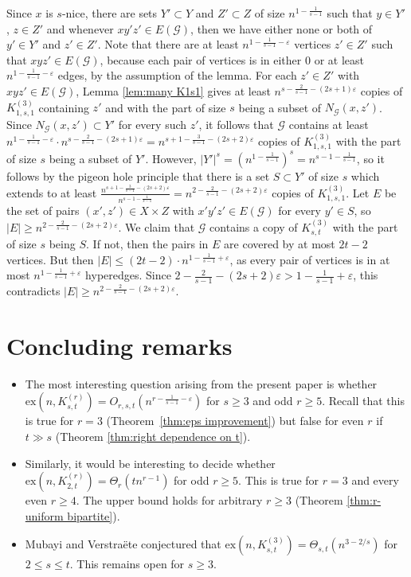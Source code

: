 \documentclass[a4paper,11pt]{article}
\makeatletter
\renewenvironment{proof}[1][\proofname] {\par\pushQED{\qed}\normalfont\topsep6\p@\@plus6\p@\relax\trivlist\item[\hskip\labelsep\bfseries#1\@addpunct{.}]\ignorespaces}{\popQED\endtrivlist\@endpefalse}
\theoremstyle{definition}
\def\eps{\varepsilon}
\def\cG{\mathcal{G}}
\def\ex{\mathrm{ex}}
\makeatother
\begin{document}
\begin{proof}[Proof of Lemma \ref{lem:structure enough}]
    Since $x$ is $s$-nice, there are sets $Y'\subset Y$ and $Z'\subset Z$ of size $n^{1-\frac{1}{s-1}}$ such that $y\in Y'$, $z\in Z'$ and whenever $xy'z'\in E(\cG)$, then we have either none or both of $y'\in Y'$ and $z'\in Z'$.
    Note that there are at least $n^{1-\frac{1}{s-1}-\eps}$ vertices $z'\in Z'$ such that $xyz'\in E(\cG)$, because each pair of vertices is in either $0$ or at least $n^{1-\frac{1}{s-1}-\eps}$ edges, by the assumption of the lemma. 
    For each $z'\in Z'$ with $xyz'\in E(\cG)$, Lemma \ref{lem:many K1s1} gives at least $n^{s-\frac{2}{s-1}-(2s+1)\eps}$ copies of $K_{1,s,1}^{(3)}$ containing $z'$ and with the part of size $s$ being a subset of $N_{\cG}(x,z')$. Since $N_{\cG}(x,z')\subset Y'$ for every such $z'$, it follows that $\cG$ contains at least $n^{1-\frac{1}{s-1}-\eps}\cdot n^{s-\frac{2}{s-1}-(2s+1)\eps}=n^{s+1-\frac{3}{s-1}-(2s+2)\eps}$ copies of $K_{1,s,1}^{(3)}$ with the part of size $s$ being a subset of $Y'$. However, $|Y'|^s=(n^{1-\frac{1}{s-1}})^s = n^{s-1-\frac{1}{s-1}}$, so it follows by the pigeon hole principle that there is a set $S\subset Y'$ of size $s$ which extends to at least $\frac{n^{s+1-\frac{3}{s-1}-(2s+2)\eps}}{n^{s-1-\frac{1}{s-1}}}=n^{2-\frac{2}{s-1}-(2s+2)\eps}$ copies of $K_{1,s,1}^{(3)}$. 
    Let $E$ be the set of pairs $(x',z') \in X \times Z$ with $x'y'z' \in E(\mathcal{G})$ for every $y' \in S$, so $|E| \geq n^{2-\frac{2}{s-1}-(2s+2)\eps}$.
    We claim that $\cG$ contains a copy of $K_{s,t}^{(3)}$ with the part of size $s$ being $S$. If not, then the pairs in $E$ are covered by at most $2t-2$ vertices. But then $|E| \leq (2t-2) \cdot n^{1-\frac{1}{s-1}+\eps}$, as every pair of vertices is in at most $n^{1-\frac{1}{s-1}+\eps}$ hyperedges. Since $2-\frac{2}{s-1}-(2s+2)\eps>1-\frac{1}{s-1}+\eps$, this contradicts $|E| \geq n^{2-\frac{2}{s-1}-(2s+2)\eps}$.
\end{proof}

\section{Concluding remarks} \label{sec:concluding remarks}
\begin{itemize}
    \item The most interesting question arising from the present paper is whether $\ex(n,K_{s,t}^{(r)}) = O_{r,s,t}(n^{r - \frac{1}{s-1} - \varepsilon})$ for $s\geq 3$ and odd $r \geq 5$. Recall that this is true for $r = 3$ (Theorem~\ref{thm:eps improvement}) but false for even $r$ if $t \gg s$ (Theorem \ref{thm:right dependence on t}).
    \item Similarly, it would be interesting to decide whether $\ex(n,K_{2,t}^{(r)})=\Theta_r(tn^{r-1})$ for odd $r\geq 5$. This is true for $r=3$ and every even $r\geq 4$. The upper bound holds for arbitrary $r\geq 3$ (Theorem \ref{thm:r-uniform bipartite}).
    \item Mubayi and Verstra\"ete conjectured that $\ex(n,K_{s,t}^{(3)}) = \Theta_{s,t}(n^{3-2/s})$ for $2 \leq s \leq t$. This remains open for $s \geq 3$.
\end{itemize}
\end{document}
